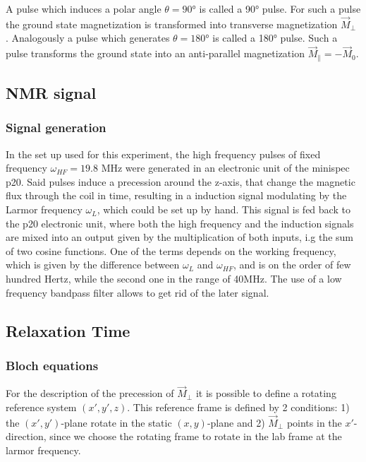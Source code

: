 A pulse which induces a  polar angle $\theta = 90$° is called a 90° pulse. For such a pulse the ground state magnetization is transformed into transverse magnetization $\vec{M}_{\perp}$%
. Analogously a pulse which generates $\theta = 180°$ is called a 180° pulse. Such a pulse transforms the ground state into an anti-parallel magnetization $\vec{M}_{\parallel} = -\vec{M}_0$. %
\subsection{NMR signal}
\subsubsection{Signal generation}
In the set up used for this experiment, the high frequency pulses of fixed frequency $\omega_{HF} = 19.8$ MHz were generated in an electronic unit of the minispec p20. Said pulses induce a precession around the z-axis, that change the magnetic flux through the coil in time, resulting in a induction signal modulating by the Larmor frequency $\omega_L$, which could be set up by hand. This signal is fed back to the p20 electronic unit, where both the high frequency and the induction signals are mixed into an output given by the multiplication of both inputs, i.g the sum of two cosine functions. One of the terms depends on the working frequency, which is given by the difference between $\omega_L$ and $\omega_{HF}$, and is on the order of few hundred Hertz, while the second one in the range of 40MHz. The use of a low frequency bandpass filter allows to get rid of the later signal.   
\subsection{Relaxation Time}
\subsubsection{Bloch equations}
For the description of the precession of $\vec{M}_{\perp}$ it is possible to define a rotating reference system $(x', y', z)$. This reference frame is defined by 2 conditions: 1) the $(x', y')$-plane rotate in the static $(x, y)$-plane and 2) $\vec{M}_{\perp}$ points in the $x'$-direction, since we choose the rotating frame to rotate in the lab frame at the larmor frequency.



